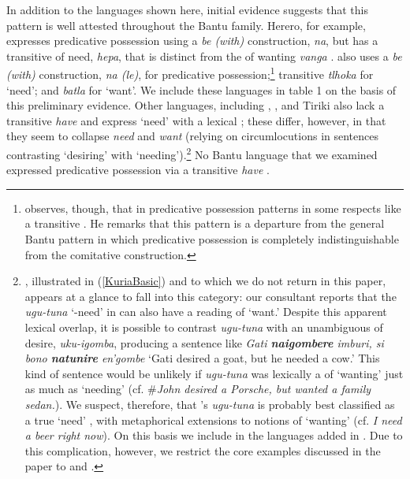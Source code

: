 \documentclass[output=paper,
modfonts
]{langscibook}
\begin{document}
In addition to the languages shown here,  initial evidence suggests that this pattern is well attested throughout the Bantu family.  Herero, for example,  expresses predicative possession using a {\it
    be (with)} construction, {\it na}, but has a transitive  of
  need, {\it hepa}, that is distinct from the  of wanting {\it
    vanga} \citep{Nguako:2013}.   also uses a {\it
    be (with)} construction, {\it na (le)}, for predicative possession;\footnote{\citet{Creissels:2013} observes, though, that in  predicative possession patterns in some respects like a transitive .  He remarks that this pattern is a departure from the general Bantu pattern in which predicative possession is completely indistinguishable from the comitative construction.}
  transitive {\it tlhoka} for `need'; and {\it batla} for `want'.
  We
  include these languages in table 1 on the basis of this preliminary
  evidence. Other languages, including , , and Tiriki also lack a transitive 
  {\it have} and express `need' with a lexical ;  these
  differ, however, in  that they seem to collapse {\it need} and  {\it want} (relying on circumlocutions in sentences contrasting `desiring' with
  `needing').\footnote{, illustrated in (\ref{KuriaBasic}) and to which we do not return in this paper, appears at a glance to fall into this category: our consultant reports that the  {\it ugu-tuna} `{}-need' in
    can also have a reading of `want.' Despite this apparent lexical overlap,  %
   it is
 possible to contrast {\it ugu-tuna} with an unambiguous   of desire, {\it
   uku-igomba}, producing a  sentence like {\it Gati \textbf{naigombere} imburi,
   si bono \textbf{natunire} en'gombe}  `Gati desired a goat, but he needed a
 cow.' This kind of sentence would be unlikely if {\it ugu-tuna} was
lexically a  of `wanting' just as much as `needing' (cf. 
\#{\it John desired a Porsche, but wanted a family sedan.}). We
suspect, therefore, that 's {\it ugu-tuna}  is probably best
classified as a true `need' , with metaphorical extensions to
notions of `wanting' (cf.  {\it I need a beer right now}). On
this basis we include  in the languages added in . Due
to this complication, however, we restrict the core  examples
discussed in the paper to  and .} %
 No Bantu language that we
  examined expressed predicative possession via a transitive {\it
    have}  .
\end{document}
